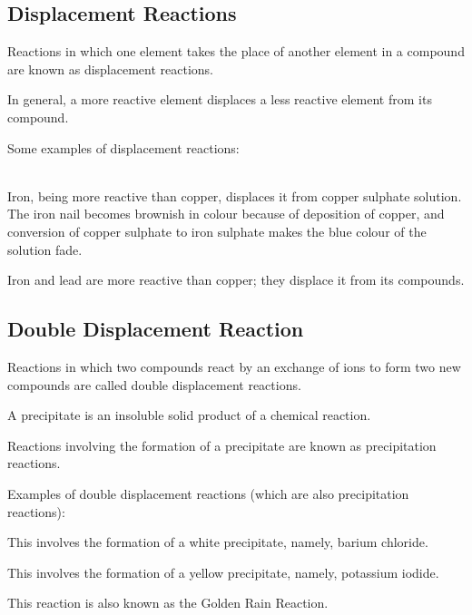 \subsection{Displacement Reactions}

\begin{outline}
    \1 Reactions in which one element takes the place of another element in a compound are known as displacement reactions.

    \1 In general, a more reactive element displaces a less reactive element from its compound.

    \1 Some examples of displacement reactions:

    \2  \\
    Iron, being more reactive than copper, displaces it from copper sulphate solution. The iron nail becomes brownish in colour because of deposition of copper, and conversion of copper sulphate to iron sulphate makes the blue colour of the solution fade.

    \2 

    \2 

    Iron and lead are more reactive than copper; they displace it from its compounds.
\end{outline}

\subsection{Double Displacement Reaction}

\begin{outline}

    \1 Reactions in which two compounds react by an exchange of ions to form two new compounds are called double displacement reactions.

    \1 A precipitate is an insoluble solid product of a chemical reaction.

    \1 Reactions involving the formation of a precipitate are known as precipitation reactions.

    \1 Examples of double displacement reactions (which are also precipitation reactions):

    \2 

    This involves the formation of a white precipitate, namely, barium chloride.

    \2 

    This involves the formation of a yellow precipitate, namely, potassium iodide.

    \begin{remark}
        This reaction is also known as the Golden Rain Reaction. 
    \end{remark}
\end{outline}

